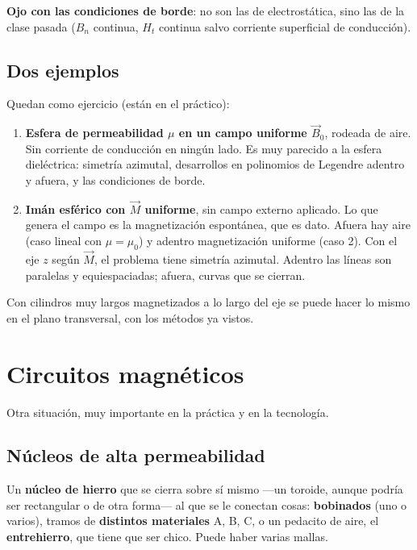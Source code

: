 \documentclass[12pt,a4paper]{article}
\begin{document}
\begin{warnbox}
\textbf{Ojo con las condiciones de borde}: no son las de electrostática, sino las
de la clase pasada ($B_n$ continua, $H_t$ continua salvo corriente
superficial de conducción).
\end{warnbox}

\subsection{Dos ejemplos}

Quedan como ejercicio (están en el práctico):

\begin{enumerate}
  \item \textbf{Esfera de permeabilidad $\mu$ en un campo uniforme $\vec B_0$}, rodeada
  de aire. Sin corriente de conducción en ningún lado. Es muy parecido a la
  esfera dieléctrica: simetría azimutal, desarrollos en polinomios de
  Legendre adentro y afuera, y las condiciones de borde.
  \item \textbf{Imán esférico con $\vec M$ uniforme}, sin campo externo aplicado. Lo que
  genera el campo es la magnetización espontánea, que es dato. Afuera hay aire
  (caso lineal con $\mu = \mu_0$) y adentro magnetización uniforme (caso 2).
  Con el eje $z$ según $\vec M$, el problema tiene simetría azimutal. Adentro
  las líneas son paralelas y equiespaciadas; afuera, curvas que se cierran.
\end{enumerate}

Con cilindros muy largos magnetizados a lo largo del eje se puede hacer lo
mismo en el plano transversal, con los métodos ya vistos.

\section{Circuitos magnéticos}

Otra situación, muy importante en la práctica y en la tecnología.

\subsection{Núcleos de alta permeabilidad}

Un \textbf{núcleo de hierro} que se cierra sobre sí mismo ---un toroide, aunque podría
ser rectangular o de otra forma--- al que se le conectan cosas: \textbf{bobinados}
(uno o varios), tramos de \textbf{distintos materiales} A, B, C, o un pedacito de
aire, el \textbf{entrehierro}, que tiene que ser chico. Puede haber varias mallas.
\end{document}

